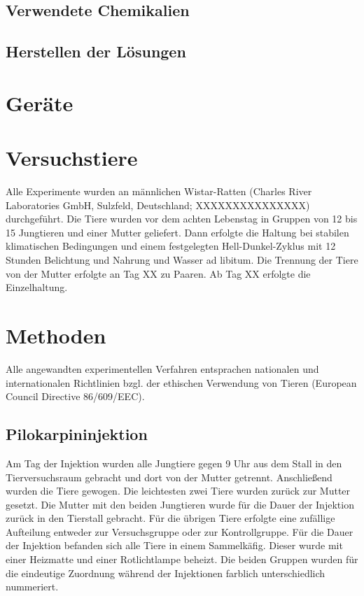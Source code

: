 \documentclass[a4paper,11pt]{report}
\begin{document}
{\subsection{Verwendete Chemikalien}

\subsection{Herstellen der Lösungen}

\section{Geräte}

\section{Versuchstiere}
Alle Experimente wurden an männlichen Wistar-Ratten (Charles River Laboratories GmbH, Sulzfeld, Deutschland; XXXXXXXXXXXXXXX) durchgeführt. Die Tiere wurden vor dem  achten Lebenstag in Gruppen von 12 bis 15 Jungtieren und einer Mutter geliefert. Dann erfolgte die Haltung bei stabilen klimatischen Bedingungen und einem festgelegten Hell-Dunkel-Zyklus mit 12 Stunden Belichtung und Nahrung und Wasser ad libitum. Die Trennung der Tiere von der Mutter erfolgte an Tag XX zu Paaren. Ab Tag XX erfolgte die Einzelhaltung.
\section{Methoden}
Alle angewandten experimentellen Verfahren entsprachen nationalen und internationalen Richtlinien bzgl. der ethischen Verwendung von Tieren (European Council Directive 86/609/EEC).
\subsection{Pilokarpininjektion}
Am Tag der Injektion wurden alle Jungtiere gegen 9 Uhr aus dem Stall in den Tierversuchsraum gebracht und dort von der Mutter getrennt. Anschließend wurden die Tiere gewogen. Die leichtesten  zwei Tiere wurden zurück zur Mutter gesetzt. Die Mutter mit den beiden Jungtieren wurde für die Dauer der Injektion zurück in den Tierstall gebracht.  Für die übrigen Tiere erfolgte eine zufällige Aufteilung entweder zur Versuchsgruppe oder zur Kontrollgruppe.  Für die Dauer der Injektion befanden sich alle Tiere in einem Sammelkäfig. Dieser wurde mit einer Heizmatte und einer Rotlichtlampe beheizt. Die beiden Gruppen wurden für die eindeutige Zuordnung während der Injektionen farblich unterschiedlich nummeriert. \\

}
\end{document}
